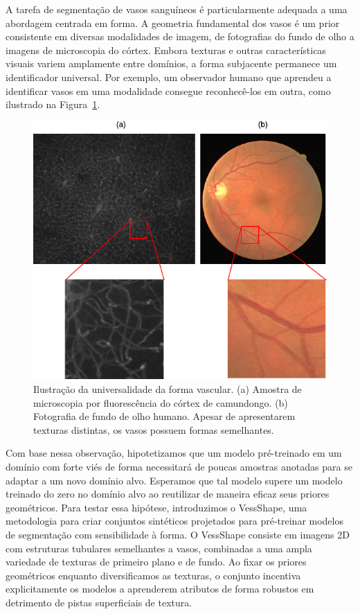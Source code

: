 \documentclass[%
reprint,
nofootinbib,
 amsmath,amssymb,
aps,
floatfix,
superscriptaddress,
showkeys,
longbibliography
]{revtex4-1}
\begin{document}
A tarefa de segmentação de vasos sanguíneos é particularmente adequada a uma abordagem centrada em forma. A geometria fundamental dos vasos é um prior consistente em diversas modalidades de imagem, de fotografias do fundo de olho a imagens de microscopia do córtex. Embora texturas e outras características visuais variem amplamente entre domínios, a forma subjacente permanece um identificador universal. Por exemplo, um observador humano que aprendeu a identificar vasos em uma modalidade consegue reconhecê-los em outra, como ilustrado na Figura~\ref{f:motivation}.

\begin{figure}[tbp]
    \centering
    \includegraphics[width=\columnwidth]{figures/vessel_retinal_cortex.pdf}
    \caption{Ilustração da universalidade da forma vascular. (a) Amostra de microscopia por fluorescência do córtex de camundongo. (b) Fotografia de fundo de olho humano. Apesar de apresentarem texturas distintas, os vasos possuem formas semelhantes.}
    \label{f:motivation}
\end{figure}

Com base nessa observação, hipotetizamos que um modelo pré-treinado em um domínio com forte viés de forma necessitará de poucas amostras anotadas para se adaptar a um novo domínio alvo. Esperamos que tal modelo supere um modelo treinado do zero no domínio alvo ao reutilizar de maneira eficaz seus priores geométricos. Para testar essa hipótese, introduzimos o VessShape, uma metodologia para criar conjuntos sintéticos projetados para pré-treinar modelos de segmentação com sensibilidade à forma. O VessShape consiste em imagens 2D com estruturas tubulares semelhantes a vasos, combinadas a uma ampla variedade de texturas de primeiro plano e de fundo. Ao fixar os priores geométricos enquanto diversificamos as texturas, o conjunto incentiva explicitamente os modelos a aprenderem atributos de forma robustos em detrimento de pistas superficiais de textura.
\end{document}
